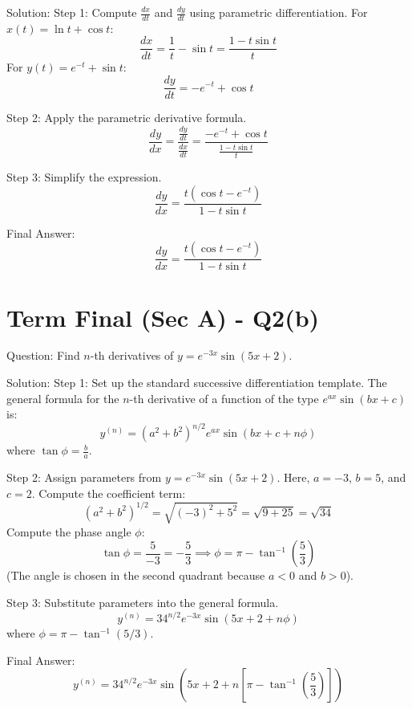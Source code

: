 \documentclass{article}
\begin{document}
Solution:
Step 1: Compute $\frac{dx}{dt}$ and $\frac{dy}{dt}$ using parametric differentiation.
For $x(t) = \ln t + \cos t$:
\[
\frac{dx}{dt} = \frac{1}{t} - \sin t = \frac{1 - t\sin t}{t}
\]
For $y(t) = e^{-t} + \sin t$:
\[
\frac{dy}{dt} = -e^{-t} + \cos t
\]

Step 2: Apply the parametric derivative formula.
\[
\frac{dy}{dx} = \frac{\frac{dy}{dt}}{\frac{dx}{dt}} = \frac{-e^{-t} + \cos t}{\frac{1 - t\sin t}{t}}
\]

Step 3: Simplify the expression.
\[
\frac{dy}{dx} = \frac{t(\cos t - e^{-t})}{1 - t\sin t}
\]

Final Answer:
\[
\boxed{\frac{dy}{dx} = \frac{t(\cos t - e^{-t})}{1 - t\sin t}}
\]

\section*{Term Final (Sec A) - Q2(b)}
Question:
Find $n$-th derivatives of $y = e^{-3x} \sin(5x+2)$.

Solution:
Step 1: Set up the standard successive differentiation template.
The general formula for the $n$-th derivative of a function of the type $e^{ax}\sin(bx+c)$ is:
\[
y^{(n)} = (a^2+b^2)^{n/2} e^{ax} \sin\left( bx+c + n\phi \right)
\]
where $\tan\phi = \frac{b}{a}$.

Step 2: Assign parameters from $y = e^{-3x}\sin(5x+2)$.
Here, $a = -3$, $b = 5$, and $c = 2$.
Compute the coefficient term:
\[
(a^2 + b^2)^{1/2} = \sqrt{(-3)^2 + 5^2} = \sqrt{9 + 25} = \sqrt{34}
\]
Compute the phase angle $\phi$:
\[
\tan\phi = \frac{5}{-3} = -\frac{5}{3} \implies \phi = \pi - \tan^{-1}\left(\frac{5}{3}\right)
\]
(The angle is chosen in the second quadrant because $a < 0$ and $b > 0$).

Step 3: Substitute parameters into the general formula.
\[
y^{(n)} = 34^{n/2} e^{-3x} \sin\left( 5x + 2 + n\phi \right)
\]
where $\phi = \pi - \tan^{-1}(5/3)$.

Final Answer:
\[
\boxed{y^{(n)} = 34^{n/2} e^{-3x} \sin\left( 5x + 2 + n \left[\pi - \tan^{-1}\left(\frac{5}{3}\right)\right] \right)}
\]
\end{document}
